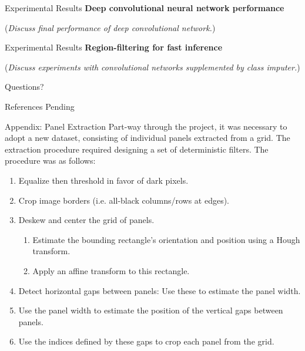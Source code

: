 \documentclass[10pt]{beamer}
\begin{document}
\begin{frame}{Experimental Results}
\textbf{Deep convolutional neural network performance}

(\emph{Discuss final performance of deep convolutional network.})
\end{frame}

\begin{frame}{Experimental Results}
\textbf{Region-filtering for fast inference}

(\emph{Discuss experiments with convolutional networks supplemented by class imputer.})
\end{frame}


\begin{frame}[standout]
  Questions?
\end{frame}


\begin{frame}{References}
Pending
\cite{}
\end{frame}


\appendix

\begin{frame}{Appendix: Panel Extraction}
	Part-way through the project, it was necessary to adopt a new dataset, consisting of individual panels extracted from a grid. The extraction procedure required designing a set of deterministic filters. The procedure was as follows:
	\begin{enumerate}
	\item Equalize then threshold in favor of dark pixels.
    	\item Crop image borders (i.e. all-black columns/rows at edges).
    	\item Deskew and center the grid of panels.
    		\begin{enumerate}
    			\item Estimate the bounding rectangle's orientation and position using a Hough transform.
    			\item Apply an affine transform to this rectangle.
    		\end{enumerate}
    	\item Detect horizontal gaps between panels: Use these to estimate the panel width.
    	\item Use the panel width to estimate the position of the vertical gaps between panels.
    	\item Use the indices defined by these gaps to crop each panel from the grid.
	\end{enumerate}
\end{frame}
\end{document}
